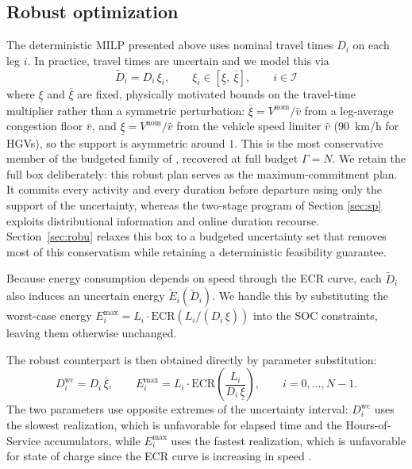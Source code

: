 \subsection{Robust optimization} \label{sec:ro}
The deterministic MILP presented above uses nominal travel times $D_i$ on each leg $i$. In practice, travel times are uncertain and we model this via
\[
  \tilde{D}_i = D_i \,\xi_i, \qquad \xi_i \in {[\underline\xi,\ \overline\xi]}, \qquad i \in \mathcal I
\]
where $\underline\xi$ and $\overline\xi$ are fixed, physically motivated bounds on the travel-time multiplier rather than a symmetric perturbation: $\overline\xi = V^{\mathrm{nom}}/\bar v$ from a leg-average congestion floor $\bar v$, and $\underline\xi = V^{\mathrm{nom}}/\hat v$ from the vehicle speed limiter $\hat v$ (90~km/h for HGVs), so the support is asymmetric around $1$. This is the most conservative member of the budgeted family of \citet{bertsimas_price_2004}, recovered at full budget $\Gamma = N$. We retain the full box deliberately: this robust plan serves as the maximum-commitment plan. It commits every activity and every duration before departure using only the support of the uncertainty, whereas the two-stage program of Section \ref{sec:sp} exploits distributional information and online duration recourse. Section~\ref{sec:robu} relaxes this box to a budgeted uncertainty set that removes most of this conservatism while retaining a deterministic feasibility guarantee.

Because energy consumption depends on speed through the ECR curve, each $\tilde{D}_i$ also induces an uncertain energy $\tilde{E}_i(\tilde{D}_i)$. We handle this  by substituting the worst-case energy $E_i^{\max} = L_i \cdot \mathrm{ECR}\!\left(L_i / (D_i\,{\underline\xi})\right)$ into the SOC constraints, leaving them otherwise unchanged.

 The robust counterpart is then obtained directly by parameter substitution:
\[
  D_i^{\mathrm{wc}} = D_i\,{\overline\xi}, \qquad
  E_i^{\max} = L_i \cdot \mathrm{ECR}\!\left(\frac{L_i}{D_i\,{\underline\xi}}\right),
  \qquad i = 0,\ldots,N-1.
\]
The two parameters use opposite extremes of the uncertainty interval: $D_i^{\mathrm{wc}}$ uses the slowest realization, which is unfavorable for elapsed time and the Hours-of-Service accumulators, while $E_i^{\max}$ uses the fastest realization, which is unfavorable for state of charge since the ECR curve is increasing  in speed . 

